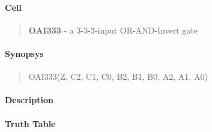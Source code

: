 \label{OAI333}
\paragraph{Cell}
\begin{quote}
    \textbf{OAI333} - a 3-3-3-input OR-AND-Invert gate
\end{quote}

\paragraph{Synopsys}
\begin{quote}
    OAI333(Z, C2, C1, C0, B2, B1, B0, A2, A1, A0)
\end{quote}

\paragraph{Description}

%

\paragraph{Truth Table}


